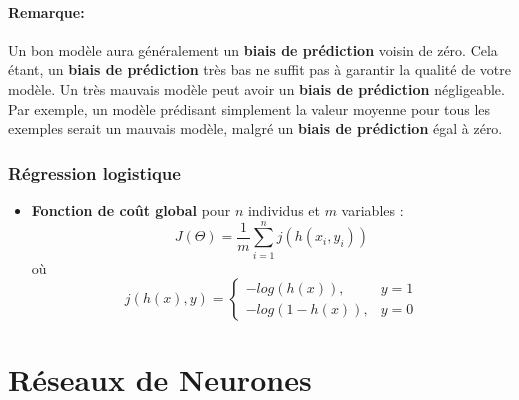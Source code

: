\documentclass[french]{article}
\begin{document}
\paragraph{Remarque:}
Un bon modèle aura généralement un \textbf{biais de prédiction} voisin de zéro. Cela étant, un \textbf{biais de prédiction} très bas ne suffit pas à garantir la qualité de votre modèle. Un très mauvais modèle peut avoir un \textbf{biais de prédiction} négligeable. Par exemple, un modèle prédisant simplement la valeur moyenne pour tous les exemples serait un mauvais modèle, malgré un \textbf{biais de prédiction} égal à zéro.

	\subsubsection{Régression logistique}
	\begin{itemize}[label=\textbullet, font=\LARGE \color{red}]
			\item \textbf{Fonction de coût global} pour $n$ individus et $m$ variables : $$
			J(\Theta)=\frac{1}{m}\sum_{i=1}^{n}j(h(x_{i},y_{i}))$$
			où $$j(h(x),y)=\left\{
			\begin{array}{ll}
			-log(h(x)), & y=1 \\
			-log(1-h(x)), & y=0
			\end{array}
			\right.
			$$
	\end{itemize}


\section{Réseaux de Neurones}
\end{document}
